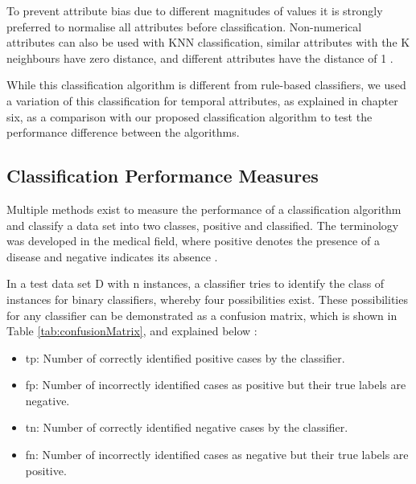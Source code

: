 To prevent attribute bias due to different magnitudes of values it is strongly preferred to normalise all attributes before classification. Non-numerical attributes can also be used with KNN classification, similar attributes with the K neighbours have zero distance, and different attributes have the distance of 1 \cite{Zaki2014}. 

While this classification algorithm is different from rule-based classifiers, we used a variation of this classification for temporal attributes, as explained in chapter six, as a comparison with our proposed classification algorithm to test the performance difference between the algorithms.


\subsection{Classification Performance Measures}


Multiple methods exist to measure the performance of a classification algorithm and classify a data set into two classes, positive and classified. The terminology was developed in the medical field, where positive denotes the presence of a disease and negative indicates its absence \cite{Fawcett2006}. 

In a test data set D with n instances, a classifier tries to identify the class of instances for binary classifiers, whereby four possibilities exist. These possibilities for any classifier can be demonstrated as a confusion matrix, which is shown in Table \ref{tab:confusionMatrix}, and explained below \cite{Zaki2014}:

\begin{itemize}
    \item \acrfull{tp}: Number of correctly identified positive cases by the classifier.
    \item \acrfull{fp}: Number of incorrectly identified cases as positive but their true labels are negative.
    \item \acrfull{tn}: Number of correctly identified negative cases by the classifier.
    \item \acrfull{fn}: Number of incorrectly identified cases as negative but their true labels are positive.
\end{itemize}

